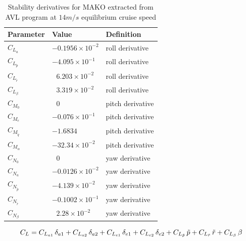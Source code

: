 \begin{table}
\label{arm:momentsMAKO}
\caption{Stability derivatives for MAKO extracted from AVL program at $14 m/s$ equilibrium cruise speed \cite{bronz2016aerodynamic}}
\label{arm:MAKOstabilityDeriv}
\begin{center}
\begin{tabular}{ ||p{3cm}|p{3cm}|p{3cm}||}\hline
\textbf{Parameter} & \textbf{Value} & \textbf{Definition} \\\hline
$C_{L_a}$                             & $-0.1956 \times 10^{-2}$	   & roll derivative \\\hline
$C_{L_{\tilde{p}}}$                 & $-4.095 \times 10^{-1}$	   & roll derivative \\\hline
$C_{L_{\tilde{r}}} $                 & $\ \ \, 6.203 \times 10^{-2}$     & roll derivative \\\hline
$C_{L_\beta}$                        & $\ \ \, 3.319 \times 10^{-2}$	   & roll derivative \\\hline
$C_{M_0}$ 			     & $\ \ \, 0$  &  pitch derivative \\\hline
$C_{M_e}$ 			     & $-0.076 \times 10^{-1}$  &  pitch derivative \\\hline
$C_{M_{\tilde{q}}} $               & $-1.6834$	                            & pitch derivative \\\hline
$C_{M_\alpha} $                    & $-32.34 \times 10^{-2}$ 	   & pitch derivative \\\hline
$C_{N_0}$                             & $\ \ \, 0$              	   & yaw derivative \\\hline
$C_{N_a}$                             & $-0.0126 \times 10^{-2}$	   & yaw derivative \\\hline
$C_{N_{\tilde{p}}}$                 & $-4.139 \times 10^{-2}$ 	   & yaw derivative \\\hline
$C_{N_{\tilde{r}}}$                 & $-0.1002 \times 10^{-1}$	   & yaw derivative \\\hline
$C_{N_\beta} $                      & $\ \ \, 2.28 \times 10^{-2}$	   & yaw derivative \\\hline
\end{tabular}
\end{center}
\end{table}

\begin{equation}{\label{eqn:bigCraftC_L}}
C_L = C_{L_{a1}} \, \delta_{a1} + C_{L_{a2}} \, \delta_{a2} + C_{L_{e1}} \, \delta_{e1} + C_{L_{e2}} \, \delta_{e2} + C_{L_{\tilde{p}}} \, \tilde{p} + C_{L_{\tilde{r}}} \, \tilde{r} +  C_{L_\beta} \, \beta 
\end{equation}

